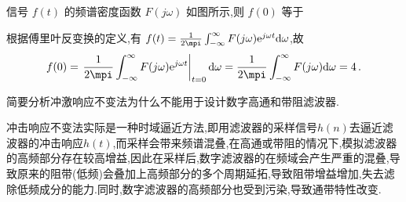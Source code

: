 \documentclass[list,answers,csize4,custom]{sysuexam}
\begin{document}
\begin{groups}
\begin{questions}[rs]
    \question[5]  信号 $f(t)$ 的频谱密度函数 $F(j \omega)$ 如图所示,则 $f(0)$ 等于
    \begin{center}
    \end{center}
    \begin{solution}
        \analysis 根据傅里叶反变换的定义,有 $f(t)=\frac{1}{2 \mpi} \int_{-\infty}^{\infty} F(j \omega) \mathrm{e}^{j \omega t} \mathrm{d} \omega$,故
        $$
    f(0)=\left.\frac{1}{2 \mpi} \int_{-\infty}^{\infty} F(j \omega) \mathrm{e}^{j \omega t}\right|_{t=0} \mathrm{d} \omega=\frac{1}{2 \mpi} \int_{-\infty}^{\infty} F(j \omega) \mathrm{d} \omega=4\,.
    $$
    \end{solution}
    
\end{questions}

\begin{questions}
    \question[10] 简要分析冲激响应不变法为什么不能用于设计数字高通和带阻滤波器.
    \begin{solution}
        \answers[答] 冲击响应不变法实际是一种时域逼近方法,即用滤波器的采样信号$h(n)$去逼近滤波器的冲击响应$h(t)$,而采样会带来频谱混叠,在高通或带阻的情况下,模拟滤波器的高频部分存在较高增益,因此在采样后,数字滤波器的在频域会产生严重的混叠,导致原来的阻带(低频)会叠加上高频部分的多个周期延拓,导致阻带增益增加,失去滤除低频成分的能力.同时,数字滤波器的高频部分也受到污染,导致通带特性改变.
    \end{solution}
\end{questions}


\end{groups}
\end{document}
